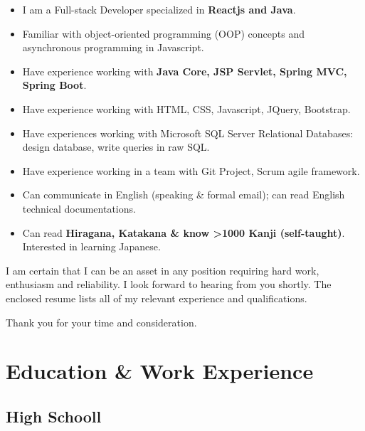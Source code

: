 \documentclass[11pt,a4paper,sans]{moderncv}        %
\begin{document}
\begin{itemize}
  \item I am a Full-stack Developer specialized in \textbf{Reactjs and Java}.
  \item Familiar with object-oriented programming (OOP) concepts and asynchronous programming in Javascript.
  \item Have experience working with \textbf{Java Core, JSP Servlet, Spring MVC, Spring Boot}.
  \item Have experience working with HTML, CSS, Javascript, JQuery, Bootstrap.
  \item Have experiences working with Microsoft SQL Server Relational Databases: design database, write queries in raw SQL. %
  \item Have experience working in a team with Git Project, Scrum agile framework.
  \item Can communicate in English (speaking \& formal email); can read English technical documentations.
  \item Can read \textbf{Hiragana, Katakana \& know >1000 Kanji (self-taught)}. Interested in learning Japanese.
\end{itemize}

I am certain that I can be an asset in any position requiring hard work, enthusiasm and reliability. I look forward to hearing from you shortly. The enclosed resume lists all of my relevant experience and qualifications.

Thank you for your time and consideration.

\makeletterclosing

\newpage


\makecvtitle

\section{Education \& Work Experience}

\subsection{High Schooll}
\end{document}
